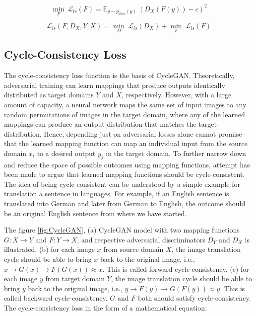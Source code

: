     \begin{equation}\label{lsgan5}        
        \underset{F}{\min}\ \mathcal{L}_{ls}(F) = \mathbb{E}_{y \sim p_{data}(y)}\ (D_X(F(y)) - c)^2
    \end{equation}
    
    
    \begin{equation}\label{lsgan6}        
        \mathcal{L}_{ls}(F, D_X, Y, X) = \underset{D}{\min}\ \mathcal{L}_{ls}(D_X) + \underset{F}{\min}\ \mathcal{L}_{ls}(F)
    \end{equation}
    

\subsection{Cycle-Consistency Loss}\label{CycleConsistencyLoss}

The cycle-consistency loss function is the basis of \ac{CycleGAN}. Theoretically, adversarial training can learn mappings that produce outputs identically distributed as target domains $Y$ and $X$, respectively\cite{goodfellow2017nips}. However, with a large amount of capacity, a neural network maps the same set of input images to any random permutations of images in the target domain,  where any of the learned mappings can produce an output distribution that matches the target distribution\cite{goodfellow2017nips}. Hence, depending just on adversarial losses alone cannot promise that the learned mapping function can map an individual input from the source domain $x_i$ to a desired output $y_j$ in the target domain. To further narrow down and reduce the space of possible outcomes using mapping functions, attempt has been made to argue that learned mapping functions should be cycle-consistent. The idea of being cycle-consistent can be understood by a simple example for translation a sentence in languages. For example, if an English sentence is translated into German and later from German to English, the outcome should be an original English sentence from where we have started. 

The figure \ref{fig:CycleGAN}, (a) \ac{CycleGAN} model with two mapping functions $G : X \rightarrow Y$ and $F : Y \rightarrow X$, and respective adversarial discriminators $D_Y$ and $D_X$ is illustrated. (b) for each image $x$ from source domain $X$, the image translation cycle should be able to bring $x$ back to the original image, i.e., $x \rightarrow G(x) \rightarrow F(G(x)) \approx x$. This is called forward cycle-consistency. (c) for each image $y$ from target domain $Y$, the image translation cycle should be able to bring $y$ back to the original image, i.e., $y \rightarrow F(y) \rightarrow G(F(y)) \approx y$. This is called backward cycle-consistency. $G$ and $F$ both should satisfy cycle-consistency. The cycle-consistency loss in the form of a mathematical equation:

